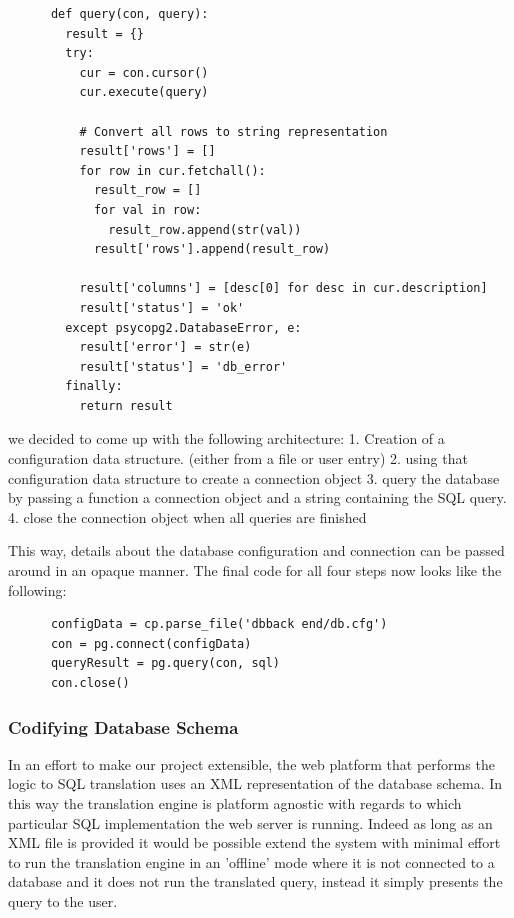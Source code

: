 \documentclass[a4paper, 11pt]{article}
\begin{document}
      \begin{verbatim}
      def query(con, query):
        result = {}
        try:
          cur = con.cursor()
          cur.execute(query)

          # Convert all rows to string representation
          result['rows'] = []
          for row in cur.fetchall():
            result_row = []
            for val in row:
              result_row.append(str(val))
            result['rows'].append(result_row)

          result['columns'] = [desc[0] for desc in cur.description]
          result['status'] = 'ok'
        except psycopg2.DatabaseError, e:
          result['error'] = str(e)
          result['status'] = 'db_error'
        finally:
          return result
      \end{verbatim}

      we decided to come up with the following architecture: 
      1. Creation of a configuration data structure. (either from a file or user
         entry)
      2. using that configuration data structure to create a connection object
      3. query the database by passing a function a connection object and a
      string containing the SQL query.
      4. close the connection object when all queries are finished

      This way, details about the database configuration and connection 
      can be passed around in an opaque manner. The final code for all four
      steps now looks like the following: 

      \begin{verbatim}
      configData = cp.parse_file('dbback end/db.cfg')
      con = pg.connect(configData)
      queryResult = pg.query(con, sql)
      con.close()
      \end{verbatim}

    \subsubsection{Codifying Database Schema}
      In an effort to make our project extensible, the web platform that performs 
      the logic to SQL translation uses an XML representation of the database
      schema. In this way the translation engine is platform agnostic with
      regards to which particular SQL implementation the web server is running.
      Indeed as long as an XML file is provided it would be possible extend the
      system with minimal effort to run the translation engine in an 'offline' mode 
      where it is not connected to a database and it does not run the translated 
      query, instead it simply presents the query to the user.
\end{document}
